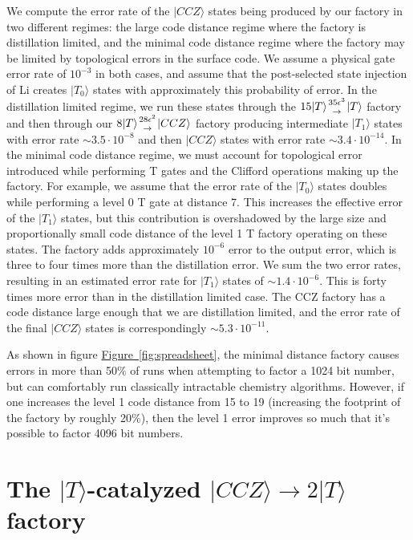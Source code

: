 \documentclass[twocolumn,accepted=2019-03-30]{quantumarticle}
\newcommand{\fig}[1]{\hyperref[fig:#1]{Figure~\ref*{fig:#1}}}
\newcommand{\factory}[3]{$#1 \genfrac{}{}{0pt}{}{#2}{\rightarrow} {#3}$ factory}
\begin{document}
We compute the error rate of the $|CCZ\rangle$ states being produced by our factory in two different regimes: the large code distance regime where the factory is distillation limited, and the minimal code distance regime where the factory may be limited by topological errors in the surface code.
We assume a physical gate error rate of $10^{-3}$ in both cases, and assume that the post-selected state injection of Li \cite{li2015} creates $|T_0\rangle$ states with approximately this probability of error.
In the distillation limited regime, we run these states through the \factory{15|T\rangle}{35 \epsilon^3}{|T\rangle} and then through our \factory{8|T\rangle}{28\epsilon^2}{|CCZ\rangle} producing intermediate $|T_1\rangle$ states with error rate $\sim 3.5 \cdot 10^{-8}$ and then $|CCZ\rangle$ states with error rate $\sim 3.4 \cdot 10^{-14}$.
In the minimal code distance regime, we must account for topological error introduced while performing T gates and the Clifford operations making up the factory.
For example, we assume that the error rate of the $|T_0\rangle$ states doubles while performing a level 0 T gate at distance 7.
This increases the effective error of the $|T_1\rangle$ states, but this contribution is overshadowed by the large size and proportionally small code distance of the level 1 T factory operating on these states.
The factory adds approximately $10^{-6}$ error to the output error, which is three to four times more than the distillation error.
We sum the two error rates, resulting in an estimated error rate for $|T_1\rangle$ states of $\sim 1.4 \cdot 10^{-6}$.
This is forty times more error than in the distillation limited case.
The CCZ factory has a code distance large enough that we are distillation limited, and the error rate of the final $|CCZ\rangle$ states is correspondingly $\sim 5.3 \cdot 10^{-11}$.

As shown in figure \fig{spreadsheet}, the minimal distance factory causes errors in more than 50\% of runs when attempting to factor a 1024 bit number, but can comfortably run classically intractable chemistry algorithms.
However, if one increases the level 1 code distance from 15 to 19 (increasing the footprint of the factory by roughly 20\%), then the level 1 error improves so much that it's possible to factor 4096 bit numbers.




\section{\texorpdfstring{
    The $|T\rangle$-catalyzed $|CCZ\rangle \rightarrow 2|T\rangle$ factory
}{
    The T-catalyzed CCZ to 2T Factory
}}
\label{sec:catalysis}
\end{document}
